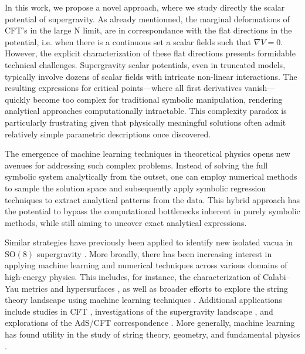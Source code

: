 \documentclass[11pt]{article}
\begin{document}
In this work, we propose a novel approach, where we study directly the scalar potential of supergravity. As already mentionned, the marginal deformations of CFT's in the large N limit, are in correspondance with the flat directions in the potential, i.e. when there is a continuous set a scalar fields such that $\nabla V = 0$. However, the explicit characterization of these flat directions presents formidable technical challenges. Supergravity scalar potentials, even in truncated models, typically involve dozens of scalar fields with intricate non-linear interactions. The resulting expressions for critical points—where all first derivatives vanish—quickly become too complex for traditional symbolic manipulation, rendering analytical approaches computationally intractable. This complexity paradox is particularly frustrating given that physically meaningful solutions often admit relatively simple parametric descriptions once discovered. 

The emergence of machine learning techniques in theoretical physics opens new avenues for addressing such complex problems. Instead of solving the full symbolic system analytically from the outset, one can employ numerical methods to sample the solution space and subsequently apply symbolic regression techniques to extract analytical patterns from the data. This hybrid approach has the potential to bypass the computational bottlenecks inherent in purely symbolic methods, while still aiming to uncover exact analytical expressions.

Similar strategies have previously been applied to identify new isolated vacua in $\mathrm{SO}(8)$ supergravity \cite{Comsa:2019rcz,Berman:2022jqn}. More broadly, there has been increasing interest in applying machine learning and numerical techniques across various domains of high-energy physics. This includes, for instance, the characterization of Calabi–Yau metrics and hypersurfaces \cite{Ashmore:2019wzb,Berman:2021mcw,Larfors:2022nep,Berglund:2022gvm,Jejjala:2020wcc,Douglas:2006rr,Larfors:2021pbb,He:2018jtw}, as well as broader efforts to explore the string theory landscape using machine learning techniques \cite{He:2017aed,Carifio:2017bov,Ruehle:2017mzq}. Additional applications include studies in CFT \cite{Chen:2020dxg}, investigations of the supergravity landscape \cite{Brady:2025zzi,Krishnan:2020sfg}, and explorations of the AdS/CFT correspondence \cite{Hashimoto:2018ftp}. More generally, machine learning has found utility in the study of string theory, geometry, and fundamental physics \cite{Ruehle:2020jrk,He:2023csq,Bao:2021auj}.
\end{document}
